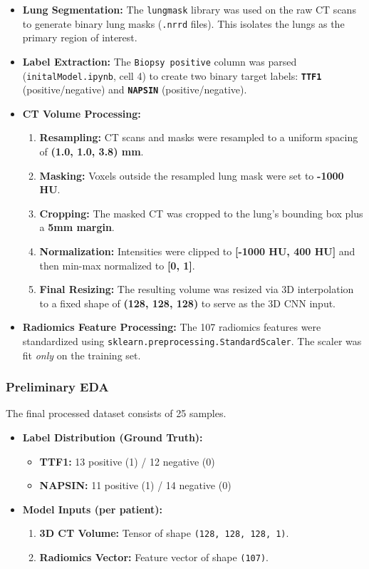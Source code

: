 \begin{itemize}
    \item \textbf{Lung Segmentation:} The \texttt{lungmask} library was used on the raw CT scans to generate binary lung masks (\texttt{.nrrd} files). This isolates the lungs as the primary region of interest.
    \item \textbf{Label Extraction:} The \texttt{Biopsy positive} column was parsed (\texttt{initalModel.ipynb}, cell 4) to create two binary target labels: \textbf{\texttt{TTF1}} (positive/negative) and \textbf{\texttt{NAPSIN}} (positive/negative).
    \item \textbf{CT Volume Processing:}
    \begin{enumerate}
        \item \textbf{Resampling:} CT scans and masks were resampled to a uniform spacing of \textbf{(1.0, 1.0, 3.8) mm}.
        \item \textbf{Masking:} Voxels outside the resampled lung mask were set to \textbf{-1000 HU}.
        \item \textbf{Cropping:} The masked CT was cropped to the lung's bounding box plus a \textbf{5mm margin}.
        \item \textbf{Normalization:} Intensities were clipped to \textbf{[-1000 HU, 400 HU]} and then min-max normalized to \textbf{[0, 1]}.
        \item \textbf{Final Resizing:} The resulting volume was resized via 3D interpolation to a fixed shape of \textbf{(128, 128, 128)} to serve as the 3D CNN input.
    \end{enumerate}
    \item \textbf{Radiomics Feature Processing:} The 107 radiomics features were standardized using \texttt{sklearn.preprocessing.StandardScaler}. The scaler was fit \textit{only} on the training set.
\end{itemize}

\subsubsection{Preliminary EDA}
The final processed dataset consists of 25 samples.
\begin{itemize}
    \item \textbf{Label Distribution (Ground Truth):}
    \begin{itemize}
        \item \textbf{TTF1:} 13 positive (1) / 12 negative (0)
        \item \textbf{NAPSIN:} 11 positive (1) / 14 negative (0)
    \end{itemize}
    \item \textbf{Model Inputs (per patient):}
    \begin{enumerate}
        \item \textbf{3D CT Volume:} Tensor of shape \texttt{(128, 128, 128, 1)}.
        \item \textbf{Radiomics Vector:} Feature vector of shape \texttt{(107)}.
    \end{enumerate}
\end{itemize}

